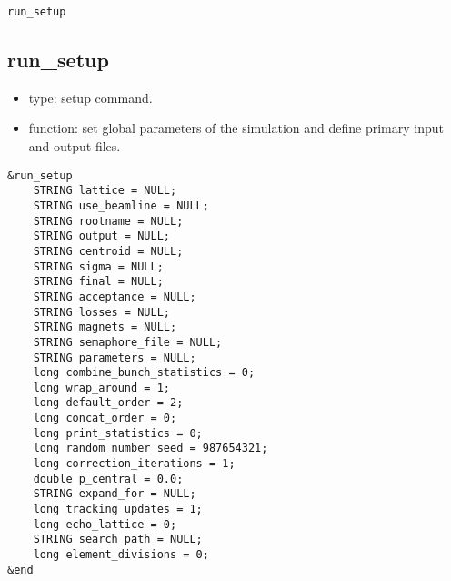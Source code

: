 \documentclass[11pt]{article}
\begin{document}
\begin{latexonly}
\newpage
\begin{center}{\Large\verb|run_setup|}\end{center}
\end{latexonly}
\subsection{run\_setup}

\begin{itemize}
\item type: setup command.
\item function: set global parameters of the simulation and define primary input and output files.
\end{itemize}

\begin{verbatim}
&run_setup
    STRING lattice = NULL;
    STRING use_beamline = NULL;
    STRING rootname = NULL;
    STRING output = NULL;
    STRING centroid = NULL;
    STRING sigma = NULL;
    STRING final = NULL;
    STRING acceptance = NULL;
    STRING losses = NULL;
    STRING magnets = NULL;
    STRING semaphore_file = NULL;
    STRING parameters = NULL;
    long combine_bunch_statistics = 0;
    long wrap_around = 1;
    long default_order = 2;
    long concat_order = 0;
    long print_statistics = 0;
    long random_number_seed = 987654321;
    long correction_iterations = 1;
    double p_central = 0.0;
    STRING expand_for = NULL; 
    long tracking_updates = 1;
    long echo_lattice = 0;
    STRING search_path = NULL;
    long element_divisions = 0;
&end
\end{verbatim}
\end{document}
